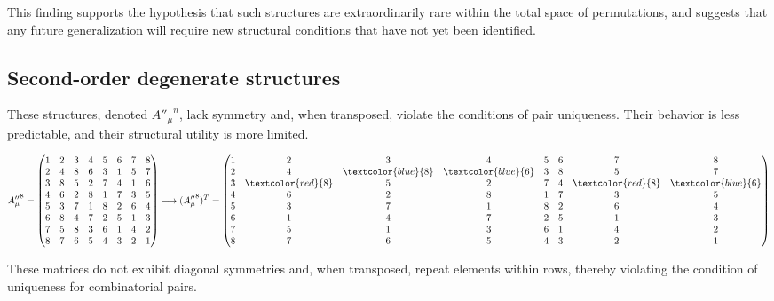 \documentclass{article}
\begin{document}
\medskip

This finding supports the hypothesis that such structures are extraordinarily rare within the total space of permutations, and suggests that any future generalization will require new structural conditions that have not yet been identified.




\subsection{Second-order degenerate structures}

These structures, denoted \({A''_\mu}^{n}\), lack symmetry and, when transposed, violate the conditions of pair uniqueness. Their behavior is less predictable, and their structural utility is more limited.

\[
{A''_\mu}^{8}=
\begin{pmatrix}
1 & 2 & 3 & 4 & 5 & 6 & 7 & 8 \\
2 & 4 & 8 & 6 & 3 & 1 & 5 & 7 \\
3 & 8 & 5 & 2 & 7 & 4 & 1 & 6 \\
4 & 6 & 2 & 8 & 1 & 7 & 3 & 5 \\
5 & 3 & 7 & 1 & 8 & 2 & 6 & 4 \\
6 & 8 & 4 & 7 & 2 & 5 & 1 & 3 \\
7 & 5 & 8 & 3 & 6 & 1 & 4 & 2 \\
8 & 7 & 6 & 5 & 4 & 3 & 2 & 1 \\
\end{pmatrix}\longrightarrow
 ({A''_\mu}^{8})^T=
\begin{pmatrix}
1 & 2 & 3 & 4 & 5 & 6 & 7 & 8 \\
2 & 4 & \textcolor{blue}{8} & \textcolor{blue}{6} & 3 & 8 & 5 & 7 \\
3 & \textcolor{red}{8} & 5 & 2 & 7 & 4 & \textcolor{red}{8} & \textcolor{blue}{6} \\
4 & 6 & 2 & 8 & 1 & 7 & 3 & 5 \\
5 & 3 & 7 & 1 & 8 & 2 & 6 & 4 \\
6 & 1 & 4 & 7 & 2 & 5 & 1 & 3 \\
7 & 5 & 1 & 3 & 6 & 1 & 4 & 2 \\
8 & 7 & 6 & 5 & 4 & 3 & 2 & 1 \\
\end{pmatrix}
\]


\medskip
These matrices do not exhibit diagonal symmetries and, when transposed, repeat elements within rows, thereby violating the condition of uniqueness for combinatorial pairs.
\end{document}
